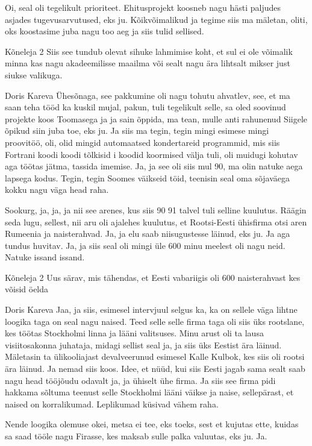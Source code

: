 Oi, seal oli tegelikult prioriteet. Ehitusprojekt koosneb nagu hästi paljudes asjades tugevusarvutused, eks ju. Kõikvõimalikud ja tegime siis ma mäletan, oliti, oks koostasime juba nagu too aeg ja siis tulid sellised. 

Kõneleja 2
Siis see tundub olevat sihuke lahmimise koht, et sul ei ole võimalik minna kas nagu akadeemilisse maailma või sealt nagu ära lihtsalt mikser just siukse valikuga. 

Doris Kareva
Ühesõnaga, see pakkumine oli nagu tohutu ahvatlev, see, et ma saan teha tööd ka kuskil mujal, pakun, tuli tegelikult selle, sa oled soovinud projekte koos Toomasega ja ja sain õppida, ma tean, mulle anti rahunenud Siigele õpikud siin juba toe, eks ju. Ja siis ma tegin, tegin mingi esimese mingi proovitöö, oli, olid mingid automaatsed kondertareid programmid, mis siis Fortrani koodi koodi tõlkisid i koodid koormised välja tuli, oli muidugi kohutav aga töötas jätma, tassida imemise. Ja, ja see oli siis mul 90, ma olin natuke aega lapsega kodus. Tegin, tegin Soomes väikseid töid, teenisin seal oma sõjaväega kokku nagu väga head raha. 

Sookurg, ja, ja, ja nii see arenes, kus siis 90 91 talvel tuli selline kuulutus. Räägin seda lugu, sellest, nii aru oli ajalehes kuulutus, et Rootsi-Eesti ühisfirma otsi aren Rumeenia ja naisterahvad. Ja, ja elu saab niisugustesse läinud, eks ju. Ja aga tundus huvitav. Ja, ja siis seal oli mingi üle 600 minu meelest oli nagu neid. Natuke issand issand. 

Kõneleja 2
Uus särav, mis tähendas, et Eesti vabariigis oli 600 naisterahvast kes võisid öelda 

Doris Kareva
Jaa, ja siis, esimesel intervjuul selgus ka, ka on sellele väga lihtne loogika taga on seal nagu naised. Teed selle selle firma taga oli siis üks rootslane, kes töötas Stockholmi linna ja lääni valitsuses. Minu arust oli ta lausa visiitosakonna juhataja, midagi sellist seal ja, ja siis üks Eestist ära läinud. Mäletasin ta ülikooliajast devalveerunud esimesel Kalle Kulbok, kes siis oli rootsi ära läinud. Ja nemad siis koos. Idee, et nüüd, kui siis Eesti jagab sama sealt saab nagu head tööjõudu odavalt ja, ja ühiselt ühe firma. Ja siis see firma pidi hakkama sõltuma teenust selle Stockholmi lääni väikse ja naise, sellepärast, et naised on korralikumad. Leplikumad küsivad vähem raha. 

Nende loogika olemuse okei, metsa ei tee, eks toeks, sest et kujutas ette, kuidas sa saad tööle nagu Firasse, kes maksab sulle palka valuutas, eks ju. Ja. 

